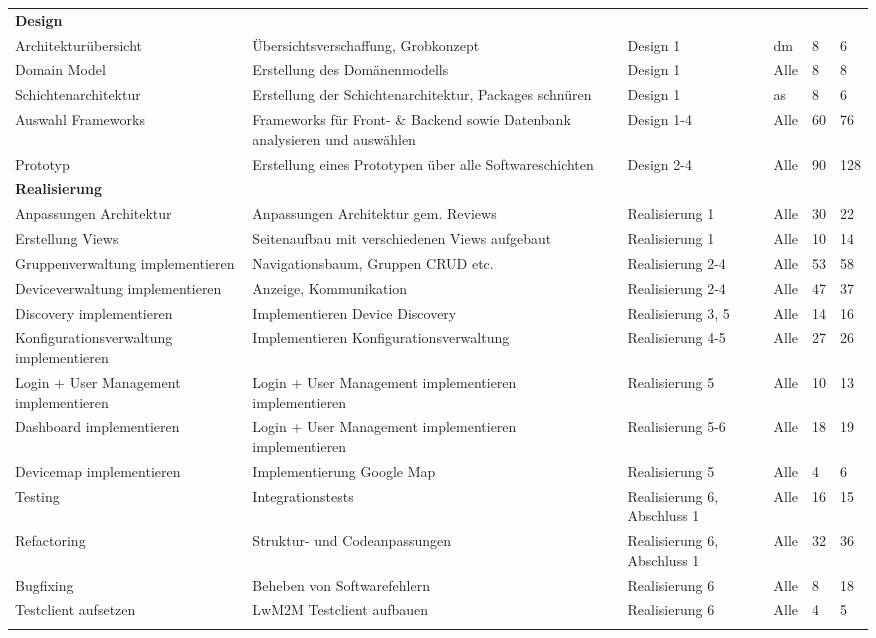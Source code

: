 \begin{landscape}
\begin{longtable}{ p{5.5cm} p{8cm} l l p{1cm} p{1cm} }
\textbf{Design}&&&&\\ \addlinespace
Architekturübersicht & Übersichtsverschaffung, Grobkonzept & Design 1 & dm & 8 & 6\\ \addlinespace
Domain Model & Erstellung des Domänenmodells & Design 1 & Alle & 8 & 8\\ \addlinespace
Schichtenarchitektur & Erstellung der Schichtenarchitektur, Packages schnüren & Design 1 & as & 8 & 6\\ \addlinespace
Auswahl Frameworks & Frameworks für Front- \& Backend sowie Datenbank analysieren und auswählen & Design 1-4 & Alle & 60 & 76\\ \addlinespace
Prototyp & Erstellung eines Prototypen über alle Softwareschichten & Design 2-4 & Alle & 90 & 128\\ \addlinespace

\textbf{Realisierung}&&&&\\ \addlinespace
Anpassungen Architektur  & Anpassungen Architektur gem. Reviews & Realisierung 1 & Alle & 30 & 22\\ \addlinespace
Erstellung Views  & Seitenaufbau mit verschiedenen Views aufgebaut & Realisierung 1 & Alle & 10 & 14\\ \addlinespace
Gruppenverwaltung implementieren & Navigationsbaum, Gruppen CRUD etc. & Realisierung 2-4 & Alle & 53 & 58\\ \addlinespace
Deviceverwaltung implementieren & Anzeige, Kommunikation & Realisierung 2-4 & Alle & 47 & 37\\ \addlinespace
Discovery implementieren & Implementieren Device Discovery & Realisierung 3, 5 & Alle & 14 & 16\\ \addlinespace
Konfigurationsverwaltung implementieren & Implementieren Konfigurationsverwaltung & Realisierung 4-5 & Alle & 27 & 26\\ \addlinespace
Login + User Management implementieren & Login + User Management implementieren implementieren & Realisierung 5 & Alle & 10 & 13\\ \addlinespace
Dashboard implementieren & Login + User Management implementieren implementieren & Realisierung 5-6 & Alle & 18 & 19\\ \addlinespace
Devicemap implementieren & Implementierung Google Map & Realisierung 5 & Alle & 4 & 6\\ \addlinespace
Testing & Integrationstests & Realisierung 6, Abschluss 1 & Alle & 16 & 15\\ \addlinespace
Refactoring & Struktur- und Codeanpassungen & Realisierung 6, Abschluss 1 & Alle & 32 & 36\\ \addlinespace
Bugfixing & Beheben von Softwarefehlern & Realisierung 6 & Alle & 8 & 18\\ \addlinespace
Testclient aufsetzen & LwM2M Testclient aufbauen & Realisierung 6 & Alle & 4 & 5\\ \addlinespace


\end{longtable}
\end{landscape}
